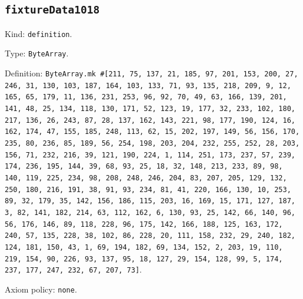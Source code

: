 \documentclass[11pt]{article}
\begin{document}
\subsection*{\texttt{fixtureData1018}}
\noindent Kind: \texttt{definition}.\par
\noindent Type: \texttt{ByteArray}.\par
\noindent Definition: \texttt{ByteArray.mk \#[211, 75, 137, 21, 185, 97, 201, 153, 200, 27, 246, 31, 130, 103, 187, 164, 103, 133, 71, 93, 135, 218, 209, 9, 12, 165, 65, 179, 11, 136, 231, 253, 96, 92, 70, 49, 63, 166, 139, 201, 141, 48, 25, 134, 118, 130, 171, 52, 123, 19, 177, 32, 233, 102, 180, 217, 136, 26, 243, 87, 28, 137, 162, 143, 221, 98, 177, 190, 124, 16, 162, 174, 47, 155, 185, 248, 113, 62, 15, 202, 197, 149, 56, 156, 170, 235, 80, 236, 85, 189, 56, 254, 198, 203, 204, 232, 255, 252, 28, 203, 156, 71, 232, 216, 39, 121, 190, 224, 1, 114, 251, 173, 237, 57, 239, 174, 236, 195, 144, 39, 68, 93, 25, 18, 32, 148, 213, 233, 89, 98, 140, 119, 225, 234, 98, 208, 248, 246, 204, 83, 207, 205, 129, 132, 250, 180, 216, 191, 38, 91, 93, 234, 81, 41, 220, 166, 130, 10, 253, 89, 32, 179, 35, 142, 156, 186, 115, 203, 16, 169, 15, 171, 127, 187, 3, 82, 141, 182, 214, 63, 112, 162, 6, 130, 93, 25, 142, 66, 140, 96, 56, 176, 146, 89, 118, 228, 96, 175, 142, 166, 188, 125, 163, 172, 240, 57, 135, 228, 38, 102, 86, 228, 20, 111, 158, 232, 29, 240, 182, 124, 181, 150, 43, 1, 69, 194, 182, 69, 134, 152, 2, 203, 19, 110, 219, 154, 90, 226, 93, 137, 95, 18, 127, 29, 154, 128, 99, 5, 174, 237, 177, 247, 232, 67, 207, 73]}.\par
\noindent Axiom policy: \texttt{none}.\par
\end{document}
